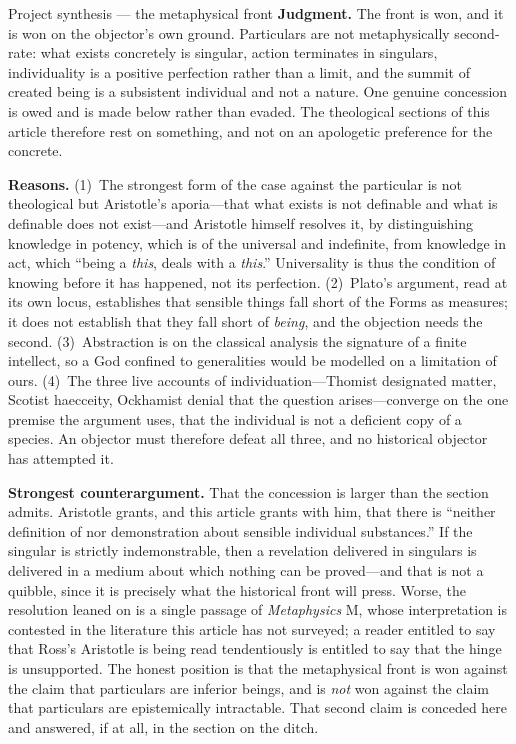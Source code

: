 \begin{studybox}{Project synthesis --- the metaphysical front}
\textbf{Judgment.} The front is won, and it is won on the objector's own ground. Particulars are not metaphysically second-rate: what exists concretely is singular, action terminates in singulars, individuality is a positive perfection rather than a limit, and the summit of created being is a subsistent individual and not a nature. One genuine concession is owed and is made below rather than evaded. The theological sections of this article therefore rest on something, and not on an apologetic preference for the concrete.

\textbf{Reasons.} (1)~The strongest form of the case against the particular is not theological but Aristotle's aporia---that what exists is not definable and what is definable does not exist---and Aristotle himself resolves it, by distinguishing knowledge in potency, which is of the universal and indefinite, from knowledge in act, which ``being a \emph{this}, deals with a \emph{this}.'' Universality is thus the condition of knowing before it has happened, not its perfection. (2)~Plato's argument, read at its own locus, establishes that sensible things fall short of the Forms as measures; it does not establish that they fall short of \emph{being}, and the objection needs the second. (3)~Abstraction is on the classical analysis the signature of a finite intellect, so a God confined to generalities would be modelled on a limitation of ours. (4)~The three live accounts of individuation---Thomist designated matter, Scotist haecceity, Ockhamist denial that the question arises---converge on the one premise the argument uses, that the individual is not a deficient copy of a species. An objector must therefore defeat all three, and no historical objector has attempted it.

\textbf{Strongest counterargument.} That the concession is larger than the section admits. Aristotle grants, and this article grants with him, that there is ``neither definition of nor demonstration about sensible individual substances.'' If the singular is strictly indemonstrable, then a revelation delivered in singulars is delivered in a medium about which nothing can be proved---and that is not a quibble, since it is precisely what the historical front will press. Worse, the resolution leaned on is a single passage of \emph{Metaphysics} M, whose interpretation is contested in the literature this article has not surveyed; a reader entitled to say that Ross's Aristotle is being read tendentiously is entitled to say that the hinge is unsupported. The honest position is that the metaphysical front is won against the claim that particulars are inferior beings, and is \emph{not} won against the claim that particulars are epistemically intractable. That second claim is conceded here and answered, if at all, in the section on the ditch.


\end{studybox}
